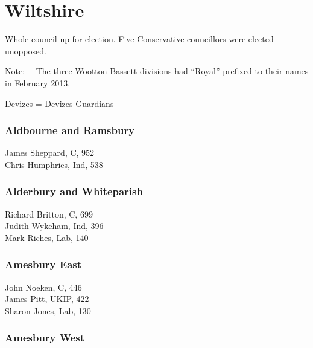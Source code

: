 \documentclass[a4paper,openany,10pt]{book}
\begin{document}
\vfill

\section{Wiltshire}

Whole council up for election. Five Conservative councillors were elected unopposed.

Note:— The three Wootton Bassett divisions had ``Royal'' prefixed to their names in February 2013.

Devizes = Devizes Guardians



\subsubsection*{Aldbourne and Ramsbury}



James Sheppard, C, 952\\
Chris Humphries, Ind, 538\\


\subsubsection*{Alderbury and Whiteparish}



Richard Britton, C, 699\\
Judith Wykeham, Ind, 396\\
Mark Riches, Lab, 140\\


\subsubsection*{Amesbury East}



John Noeken, C, 446\\
James Pitt, UKIP, 422\\
Sharon Jones, Lab, 130\\


\subsubsection*{Amesbury West}

\end{document}

